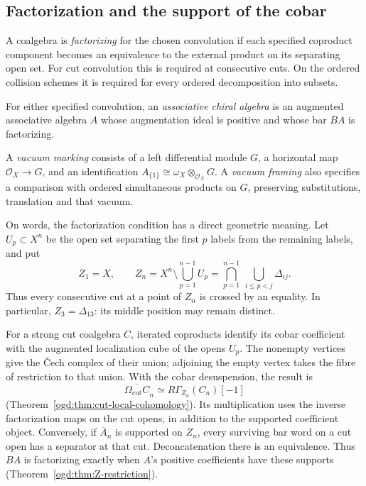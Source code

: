 \subsection{Factorization and the support of the cobar}

A coalgebra is \emph{factorizing} for the chosen convolution
if each specified coproduct component becomes an equivalence
to the external product on its separating open set. For cut
convolution this is required at consecutive cuts. On the
ordered collision schemes it is required for every ordered
decomposition into subsets.

\begin{definition}\label{e1f:def:e1}
For either specified convolution, an \emph{associative chiral
algebra} is an augmented associative algebra \(A\) whose
augmentation ideal is positive and whose bar \(BA\) is
factorizing.

A \emph{vacuum marking} consists of a left differential
module \(G\), a horizontal map \(\mathcal O_X\to G\), and
an identification
\(A_{\{1\}}\cong\omega_X\otimes_{\mathcal O_X}G\).
A \emph{vacuum framing} also specifies a comparison with
ordered simultaneous products on \(G\), preserving
substitutions, translation and that vacuum.
\end{definition}

On\label{e1f:def:cut-collision-support} words, the factorization condition has a direct geometric
meaning. Let \(U_p\subset X^n\) be the open set separating
the first \(p\) labels from the remaining labels, and put
\[
 Z_1=X,\qquad
 Z_n=X^n\setminus\bigcup_{p=1}^{n-1}U_p
     =\bigcap_{p=1}^{n-1}\ \bigcup_{i\leq p<j}\Delta_{ij}.
\]
Thus every consecutive cut at a point of \(Z_n\) is crossed
by an equality. In particular, \(Z_3=\Delta_{13}\): its
middle position may remain distinct.

For a strong cut coalgebra \(C\), iterated coproducts identify
its cobar coefficient with the augmented localization cube
of the opens \(U_p\). The nonempty vertices give the \v{C}ech
complex of their union; adjoining the empty vertex takes
the fibre of restriction to that union. With the cobar
desuspension, the result is
\[
 \overline{\Omega_{\mathrm{cut}}C}_n
                 \simeq R\Gamma_{Z_n}(C_n)[-1]
\]
(Theorem~\ref{ogd:thm:cut-local-cohomology}). Its
multiplication uses the inverse factorization maps on the
cut opens, in addition to the supported coefficient object.
Conversely, if \(\overline A_n\) is supported on \(Z_n\),
every surviving bar word on a cut open has a separator at
that cut. Deconcatenation there is an equivalence.
Thus \(BA\) is factorizing exactly when \(A\)'s positive
coefficients have these supports
(Theorem~\ref{ogd:thm:Z-restriction}).

